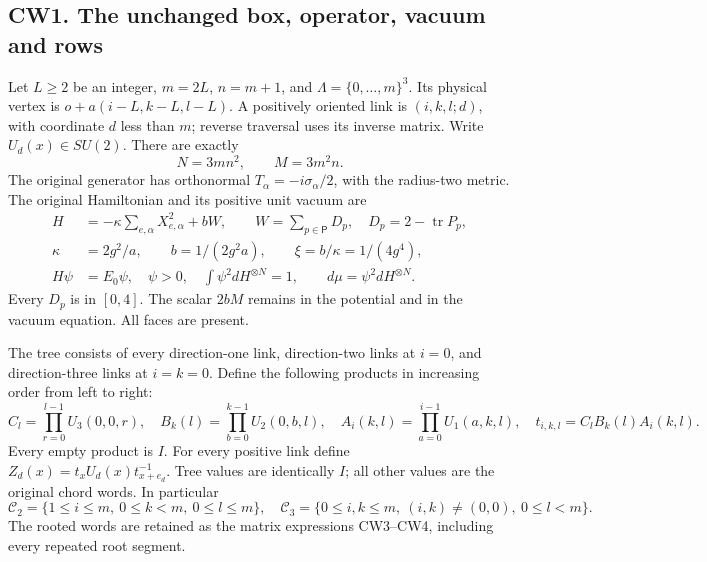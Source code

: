 \documentclass[11pt]{article}
\begin{document}
\subsection*{CW1. The unchanged box, operator, vacuum and rows}

Let \(L\ge2\) be an integer, \(m=2L\), \(n=m+1\), and
\(\Lambda=\{0,\ldots,m\}^3\). Its physical vertex is
\(o+a(i-L,k-L,l-L)\). A positively oriented link is
\((i,k,l;d)\), with coordinate \(d\) less than \(m\); reverse
traversal uses its inverse matrix. Write \(U_d(x)\in SU(2)\).
There are exactly
\[
 N=3mn^2,\qquad M=3m^2n.                                    \tag{CW1}
\]
The original generator has orthonormal
\(T_\alpha=-i\sigma_\alpha/2\), with the radius-two metric.
The original Hamiltonian and its positive unit vacuum are
\[
 \begin{aligned}
 H&=-\kappa\sum_{e,\alpha}X_{e,\alpha}^2+bW,\qquad
 W=\sum_{p\in\mathsf P}D_p,\quad D_p=2-\operatorname{tr}P_p,\\
 \kappa&=2g^2/a,\qquad b=1/(2g^2a),\qquad
 \xi=b/\kappa=1/(4g^4),\\
 H\psi&=E_0\psi,\quad \psi>0,\quad\int\psi^2dH^{\otimes N}=1,
 \qquad d\mu=\psi^2dH^{\otimes N}.
 \end{aligned}                                                 \tag{CW2}
\]
Every \(D_p\) is in \([0,4]\). The scalar \(2bM\) remains in
the potential and in the vacuum equation. All faces are present.

The tree consists of every direction-one link, direction-two links
at \(i=0\), and direction-three links at \(i=k=0\). Define the
following products in increasing order from left to right:
\[
 C_l=\prod_{r=0}^{l-1}U_3(0,0,r),\quad
 B_k(l)=\prod_{b=0}^{k-1}U_2(0,b,l),\quad
 A_i(k,l)=\prod_{a=0}^{i-1}U_1(a,k,l),\quad
 t_{i,k,l}=C_lB_k(l)A_i(k,l).                                \tag{CW3}
\]
Every empty product is \(I\). For every positive link define
\(Z_d(x)=t_xU_d(x)t_{x+e_d}^{-1}\). Tree values are identically
\(I\); all other values are the original chord words. In particular
\[
 \mathcal C_2=\{1\le i\le m,\ 0\le k<m,\ 0\le l\le m\},\quad
 \mathcal C_3=\{0\le i,k\le m,\ (i,k)\ne(0,0),\ 0\le l<m\}.
                                                               \tag{CW4}
\]
The rooted words are retained as the matrix expressions CW3–CW4,
including every repeated root segment.
\end{document}
